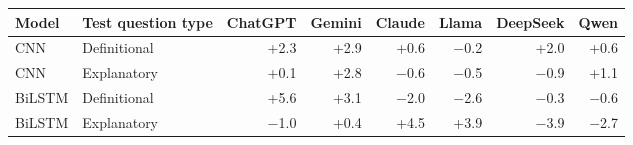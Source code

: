 \begin{tabular}{llrrrrrr}
\toprule
Model & Test question type & ChatGPT & Gemini & Claude & Llama & DeepSeek & Qwen \\
\midrule
CNN & Definitional & +2.3 & +2.9 & +0.6 & $-$0.2 & +2.0 & +0.6 \\
CNN & Explanatory & +0.1 & +2.8 & $-$0.6 & $-$0.5 & $-$0.9 & +1.1 \\
BiLSTM & Definitional & +5.6 & +3.1 & $-$2.0 & $-$2.6 & $-$0.3 & $-$0.6 \\
BiLSTM & Explanatory & $-$1.0 & +0.4 & +4.5 & +3.9 & $-$3.9 & $-$2.7 \\
\bottomrule
\end{tabular}
